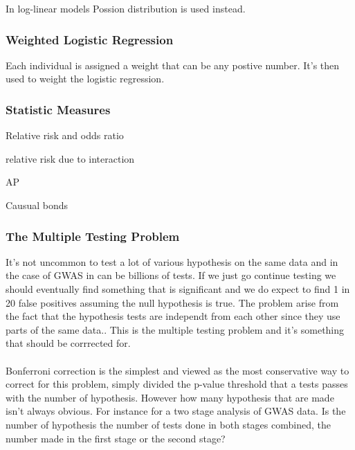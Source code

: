 \documentclass[10pt,a4paper]{article}
\begin{document}
In log-linear models Possion distribution is used instead. \cite{agresti_categorical}

\subsubsection{Weighted Logistic Regression}
Each individual is assigned a weight that can be any postive number. It's then used to weight the logistic regression.

\subsubsection{Statistic Measures}

Relative risk and odds ratio\cite{agresti_categorical}

relative risk due to interaction

AP

Causual bonds\cite{causal_bounds_arvid}

\subsubsection{The Multiple Testing Problem}
It's not uncommon to test a lot of various hypothesis on the same data and in the case of GWAS in can be billions of tests. If we just go continue testing we should eventually find something that is significant and we do expect to find 1 in 20 false positives assuming the null hypothesis is true. The problem arise from the fact that the hypothesis tests are independt from each other since they use parts of the same data.. This is the multiple testing problem and it's something that should be corrrected for.\cite{bonferroni_multiple}\\
\\
Bonferroni correction is the simplest and viewed as the most conservative way to correct for this problem, simply divided the p-value threshold that a tests passes with the number of hypothesis. However how many hypothesis that are made isn't always obvious. For instance for a two stage analysis of GWAS data. Is the number of hypothesis the number of tests done in both stages combined, the number made in the first stage or the second stage?\cite{bonferroni_multiple}
\end{document}
